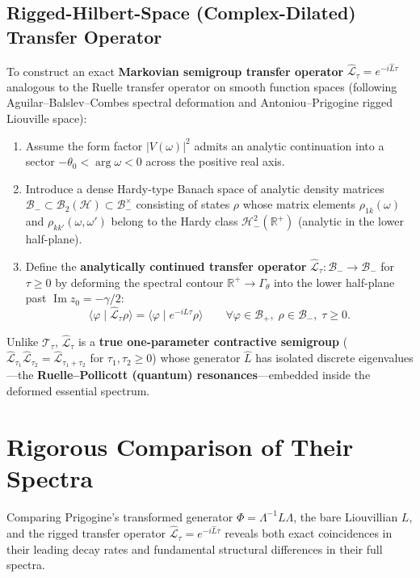 \documentclass[11pt,a4paper]{article}
\begin{document}
\subsection{Rigged-Hilbert-Space (Complex-Dilated) Transfer Operator}
To construct an exact \textbf{Markovian semigroup transfer operator} $\widehat{\mathcal{L}}_\tau = e^{-i\widehat{L}\tau}$ analogous to the Ruelle transfer operator on smooth function spaces (following Aguilar--Balslev--Combes spectral deformation and Antoniou--Prigogine rigged Liouville space):
\begin{enumerate}
    \item Assume the form factor $|V(\omega)|^2$ admits an analytic continuation into a sector $-\theta_0 < \arg \omega < 0$ across the positive real axis.
    \item Introduce a dense Hardy-type Banach space of analytic density matrices $\mathcal{B}_- \subset \mathcal{B}_2(\mathcal{H}) \subset \mathcal{B}_-^\times$ consisting of states $\rho$ whose matrix elements $\rho_{1k}(\omega)$ and $\rho_{kk'}(\omega, \omega')$ belong to the Hardy class $\mathcal{H}^2_-(\mathbb{R}^+)$ (analytic in the lower half-plane).
    \item Define the \textbf{analytically continued transfer operator} $\widehat{\mathcal{L}}_\tau : \mathcal{B}_- \to \mathcal{B}_-$ for $\tau \ge 0$ by deforming the spectral contour $\mathbb{R}^+ \to \Gamma_\theta$ into the lower half-plane past $\operatorname{Im} z_0 = -\gamma/2$:
    \begin{equation}
    \langle \varphi \mid \widehat{\mathcal{L}}_\tau \rho \rangle = \langle \varphi \mid e^{-iL\tau} \rho \rangle \qquad \forall \varphi \in \mathcal{B}_+, \; \rho \in \mathcal{B}_-, \; \tau \ge 0.
    \end{equation}
\end{enumerate}
Unlike $\mathcal{T}_\tau$, $\widehat{\mathcal{L}}_\tau$ is a \textbf{true one-parameter contractive semigroup} ($\widehat{\mathcal{L}}_{\tau_1}\widehat{\mathcal{L}}_{\tau_2} = \widehat{\mathcal{L}}_{\tau_1+\tau_2}$ for $\tau_1, \tau_2 \ge 0$) whose generator $\widehat{L}$ has isolated discrete eigenvalues---the \textbf{Ruelle--Pollicott (quantum) resonances}---embedded inside the deformed essential spectrum.

\section{Rigorous Comparison of Their Spectra}

Comparing Prigogine's transformed generator $\Phi = \Lambda^{-1} L \Lambda$, the bare Liouvillian $L$, and the rigged transfer operator $\widehat{\mathcal{L}}_\tau = e^{-i\widehat{L}\tau}$ reveals both exact coincidences in their leading decay rates and fundamental structural differences in their full spectra.
\end{document}
